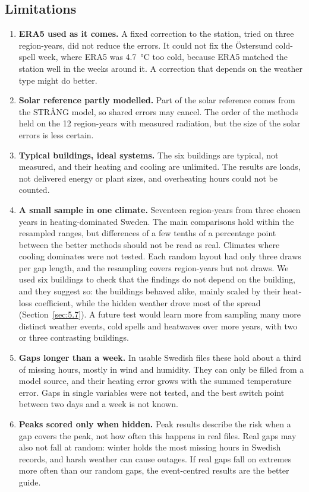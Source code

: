 \subsection{Limitations}\label{sec:6.4}

\begin{enumerate}
\item
  \textbf{ERA5 used as it comes.} A fixed correction to the station, tried on three region-years, did not reduce the errors. It could not fix the Östersund cold-spell week, where ERA5 was 4.7~°C too cold, because ERA5 matched the station well in the weeks around it. A correction that depends on the weather type might do better.
\item
  \textbf{Solar reference partly modelled.} Part of the solar reference comes from the STRÅNG model, so shared errors may cancel. The order of the methods held on the 12 region-years with measured radiation, but the size of the solar errors is less certain.
\item
  \textbf{Typical buildings, ideal systems.} The six buildings are typical, not measured, and their heating and cooling are unlimited. The results are loads, not delivered energy or plant sizes, and overheating hours could not be counted.
\item
  \textbf{A small sample in one climate.} Seventeen region-years from three chosen years in heating-dominated Sweden. The main comparisons hold within the resampled ranges, but differences of a few tenths of a percentage point between the better methods should not be read as real. Climates where cooling dominates were not tested. Each random layout had only three draws per gap length, and the resampling covers region-years but not draws. We used six buildings to check that the findings do not depend on the building, and they suggest so: the buildings behaved alike, mainly scaled by their heat-loss coefficient, while the hidden weather drove most of the spread (Section~\ref{sec:5.7}). A future test would learn more from sampling many more distinct weather events, cold spells and heatwaves over more years, with two or three contrasting buildings.
\item
  \textbf{Gaps longer than a week.} In usable Swedish files these hold about a third of missing hours, mostly in wind and humidity. They can only be filled from a model source, and their heating error grows with the summed temperature error. Gaps in single variables were not tested, and the best switch point between two days and a week is not known.
\item
  \textbf{Peaks scored only when hidden.} Peak results describe the risk when a gap covers the peak, not how often this happens in real files. Real gaps may also not fall at random: winter holds the most missing hours in Swedish records, and harsh weather can cause outages. If real gaps fall on extremes more often than our random gaps, the event-centred results are the better guide.
\end{enumerate}


